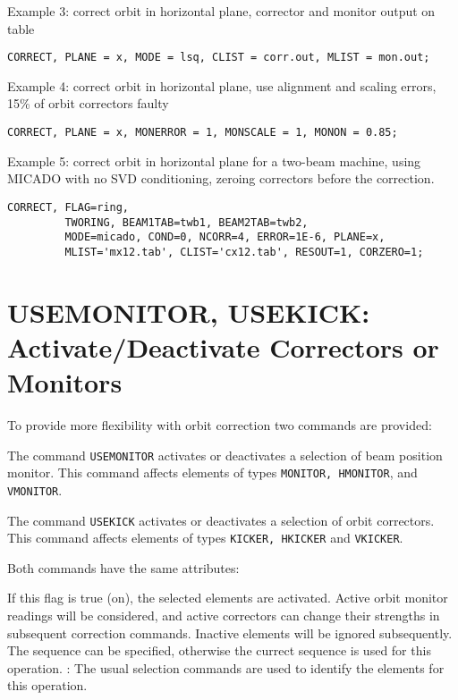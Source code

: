 Example 3: correct orbit in horizontal plane, corrector and monitor
output on table 
\begin{verbatim}
CORRECT, PLANE = x, MODE = lsq, CLIST = corr.out, MLIST = mon.out;   
\end{verbatim}

Example 4: correct orbit in horizontal plane, use alignment and scaling
errors, 15\% of orbit correctors faulty
\begin{verbatim}
CORRECT, PLANE = x, MONERROR = 1, MONSCALE = 1, MONON = 0.85; 
\end{verbatim}

Example 5: correct orbit in horizontal plane for a two-beam machine,
using MICADO with no SVD conditioning, zeroing correctors before the
correction. 
\begin{verbatim}
CORRECT, FLAG=ring,
         TWORING, BEAM1TAB=twb1, BEAM2TAB=twb2,
         MODE=micado, COND=0, NCORR=4, ERROR=1E-6, PLANE=x,
         MLIST='mx12.tab', CLIST='cx12.tab', RESOUT=1, CORZERO=1;
\end{verbatim}




%
\section{USEMONITOR, USEKICK: Activate/Deactivate Correctors or Monitors}
\label{sec:activate}
To provide more flexibility with orbit correction two commands are
provided:  


The command \texttt{USEMONITOR} activates or deactivates a
selection of beam position monitor. 
This command affects elements of types \texttt{MONITOR, HMONITOR},
and \texttt{VMONITOR}.    

The command  \texttt{USEKICK} activates or deactivates a selection
of orbit correctors. This command
affects elements of types \texttt{KICKER, HKICKER} and \texttt{VKICKER}. 


Both commands have the same attributes: 
\begin{madlist}
    If this flag is true (on), the selected elements
     are activated. Active orbit monitor readings will be
     considered, and active correctors can change their strengths
     in subsequent correction commands. Inactive elements will be
     ignored subsequently.  
    The sequence can be specified, otherwise the
     currect sequence is used for this operation.  
   : The usual selection commands are
     used to identify the elements for this operation.  
\end{madlist} 

